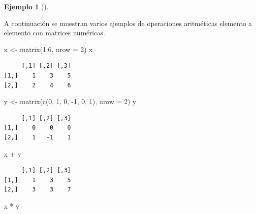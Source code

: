 \documentclass[
  a4paper,
]{scrreport}
\newenvironment{Shaded}{\begin{snugshade}}{\end{snugshade}}
\newcommand{\AttributeTok}[1]{\textcolor[rgb]{0.40,0.45,0.13}{#1}}
\newcommand{\DecValTok}[1]{\textcolor[rgb]{0.68,0.00,0.00}{#1}}
\newcommand{\FunctionTok}[1]{\textcolor[rgb]{0.28,0.35,0.67}{#1}}
\newcommand{\NormalTok}[1]{\textcolor[rgb]{0.00,0.23,0.31}{#1}}
\newcommand{\OtherTok}[1]{\textcolor[rgb]{0.00,0.23,0.31}{#1}}
\newcommand{\SpecialCharTok}[1]{\textcolor[rgb]{0.37,0.37,0.37}{#1}}
\theoremstyle{definition}
\newtheorem{example}{Ejemplo}[chapter]
\theoremstyle{definition}
\theoremstyle{remark}
\begin{document}
\leavevmode{}%
\begin{example}[]\label{exm-operaciones-aritmeticas-matrices}

A continuación se muestran varios ejemplos de operaciones aritméticas
elemento a elemento con matrices numéricas.

\begin{Shaded}
\begin{Highlighting}[]
\NormalTok{x }\OtherTok{\textless{}{-}} \FunctionTok{matrix}\NormalTok{(}\DecValTok{1}\SpecialCharTok{:}\DecValTok{6}\NormalTok{, }\AttributeTok{nrow =} \DecValTok{2}\NormalTok{)}
\NormalTok{x}
\end{Highlighting}
\end{Shaded}

\begin{verbatim}
     [,1] [,2] [,3]
[1,]    1    3    5
[2,]    2    4    6
\end{verbatim}

\begin{Shaded}
\begin{Highlighting}[]
\NormalTok{y }\OtherTok{\textless{}{-}} \FunctionTok{matrix}\NormalTok{(}\FunctionTok{c}\NormalTok{(}\DecValTok{0}\NormalTok{, }\DecValTok{1}\NormalTok{, }\DecValTok{0}\NormalTok{, }\SpecialCharTok{{-}}\DecValTok{1}\NormalTok{, }\DecValTok{0}\NormalTok{, }\DecValTok{1}\NormalTok{), }\AttributeTok{nrow =} \DecValTok{2}\NormalTok{)}
\NormalTok{y}
\end{Highlighting}
\end{Shaded}

\begin{verbatim}
     [,1] [,2] [,3]
[1,]    0    0    0
[2,]    1   -1    1
\end{verbatim}

\begin{Shaded}
\begin{Highlighting}[]
\NormalTok{x }\SpecialCharTok{+}\NormalTok{ y}
\end{Highlighting}
\end{Shaded}

\begin{verbatim}
     [,1] [,2] [,3]
[1,]    1    3    5
[2,]    3    3    7
\end{verbatim}

\begin{Shaded}
\begin{Highlighting}[]
\NormalTok{x }\SpecialCharTok{*}\NormalTok{ y}
\end{Highlighting}
\end{Shaded}


\end{example}
\end{document}

